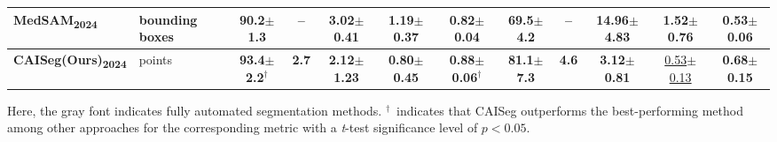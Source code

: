 \documentclass[journal,twoside,web]{ieeecolor}
\begin{document}
\begin{table}[t]
{\begin{tabular}{l l c c c c c c c c c c}
MedSAM\textsubscript{2024} & bounding boxes & 90.2$\pm$1.3 & -- & 3.02$\pm$0.41 & 1.19$\pm$0.37 & 0.82$\pm$0.04 & 69.5$\pm$4.2 & -- & 14.96$\pm$4.83 & 1.52$\pm$0.76 & 0.53$\pm$0.06\\
\hline
\textbf{CAISeg(Ours)\textsubscript{2024}} & points & \textbf{93.4$\pm$2.2}$^\dagger$ & \textbf{2.7} & \textbf{2.12$\pm$1.23} & \textbf{0.80$\pm$0.45} & \textbf{0.88$\pm$0.06}$^\dagger$ & \textbf{81.1$\pm$7.3} & \textbf{4.6} & \textbf{3.12$\pm$0.81} & \underline{0.53$\pm$0.13} & \textbf{0.68$\pm$0.15}\\
\hline
\end{tabular}%
} %

\vspace{3pt}
\parbox{0.96\textwidth}{\footnotesize
Here, the gray font indicates fully automated segmentation methods. $^\dagger$~indicates that CAISeg outperforms the best-performing method among other approaches for the corresponding metric with a \emph{t}-test significance level of $p{<}0.05$.
}
\end{table}
\end{document}
